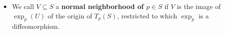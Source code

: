 \documentclass[10pt]{article}
\newcommand{\dee}{\mathrm{d}}
\newcommand{\ve}[1]{\mathbf{#1}}
\newcommand{\sseq}{\subseteq}
\begin{document}
\begin{itemize}
\begin{proof}
      Consider the curve $\alpha(t) = tv$, $v \in T_p(S)$. We have that $\alpha(0) = \ve{0}$ and $\alpha'(0) = v$. The curve $(\exp_p \circ \alpha)(t) = \exp_p(tv)$. Therefore,
      \begin{align*}
        \frac{\dee}{\dee t} (\exp_p(tv))\bigg|_{t=0} = \frac{\dee}{\dee t} (\gamma(t, v))\bigg|_{t=0} = v.
      \end{align*}
      If follows that $\dee(\exp_p)_{\ve{0}}(v) = v$, which means that it is non-singular. The proposition is true by applying the inverse function theorem.
    \end{proof}

    \item We call $V \sseq S$ a {\bf normal neighborhood of $p \in S$} if $V$ is the image of $\exp_p(U)$ of the origin of $T_p(S)$, restricted to which $\exp_p$ is a diffeomorphism.   
  \end{itemize}
\end{document}
